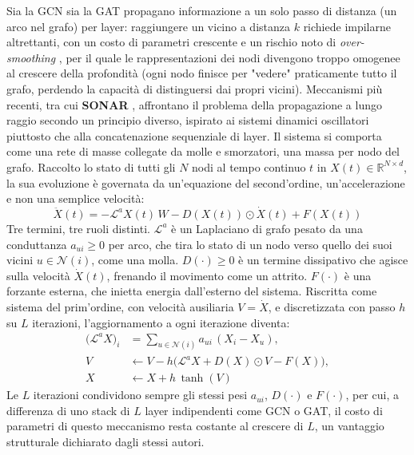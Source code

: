 Sia la GCN sia la GAT propagano informazione a un solo passo di distanza
(un arco nel grafo) per layer: raggiungere un vicino a distanza $k$
richiede impilarne altrettanti, con un costo di parametri crescente e un
rischio noto di \emph{over-smoothing} \citep{li2018oversmoothing}, per il quale le rappresentazioni
dei nodi divengono troppo omogenee al crescere della profondità (ogni nodo
finisce per "vedere" praticamente tutto il grafo, perdendo la capacità di
distinguersi dai propri vicini). Meccanismi più recenti, tra cui \textbf{SONAR} \citep{trenta2025sonar},
affrontano il problema della propagazione a lungo raggio secondo un
principio diverso, ispirato ai sistemi dinamici oscillatori piuttosto che
alla concatenazione sequenziale di layer. Il sistema si comporta come una
rete di masse collegate da molle e smorzatori, una massa per nodo del
grafo. Raccolto lo stato di tutti gli $N$ nodi al tempo continuo $t$ in
$X(t) \in \mathbb{R}^{N \times d}$, la sua evoluzione è governata da
un'equazione del second'ordine, un'accelerazione e non una semplice
velocità:
\begin{equation}
  \ddot X(t) = -\mathcal{L}^a X(t)\, W - D(X(t)) \odot \dot X(t) + F(X(t))
  \label{eq:sonar-wave-background}
\end{equation}
Tre termini, tre ruoli distinti. $\mathcal{L}^a$ è un Laplaciano di grafo
pesato da una conduttanza $a_{ui} \geq 0$ per arco, che tira lo stato di un
nodo verso quello dei suoi vicini $u \in \mathcal{N}(i)$, come una molla.
$D(\cdot) \geq 0$ è un termine dissipativo che agisce sulla velocità
$\dot X(t)$, frenando il movimento come un attrito. $F(\cdot)$ è una
forzante esterna, che inietta energia dall'esterno del sistema. Riscritta
come sistema del prim'ordine, con velocità ausiliaria $V=\dot X$, e
discretizzata con passo $h$ su $L$ iterazioni, l'aggiornamento a ogni
iterazione diventa:
\begin{equation}
  \begin{aligned}
    \big(\mathcal{L}^a X\big)_i & = \sum_{u \in \mathcal{N}(i)} a_{ui}\,(X_i - X_u),              \\
    V                           & \leftarrow V - h\big(\mathcal{L}^a X + D(X)\odot V - F(X)\big), \\
    X                           & \leftarrow X + h\,\tanh(V)
  \end{aligned}
  \label{eq:sonar-discrete-background}
\end{equation}
Le $L$ iterazioni condividono sempre gli stessi pesi $a_{ui}$, $D(\cdot)$ e
$F(\cdot)$, per cui, a differenza di uno stack di $L$ layer indipendenti
come GCN o GAT, il costo di parametri di questo meccanismo resta costante
al crescere di $L$, un vantaggio strutturale dichiarato dagli stessi
autori.

